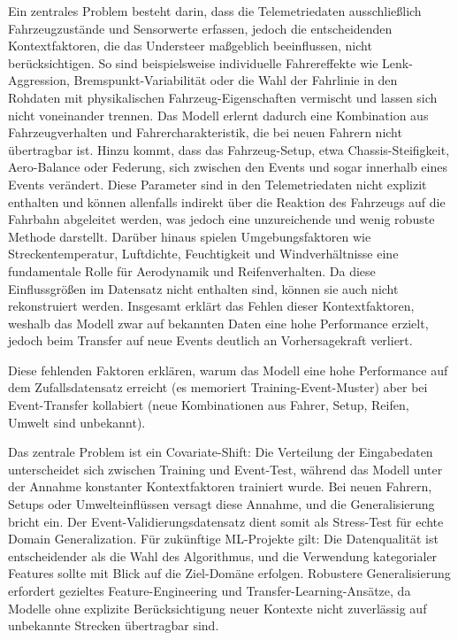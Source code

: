 Ein zentrales Problem besteht darin, dass die Telemetriedaten ausschließlich Fahrzeugzustände und Sensorwerte erfassen, jedoch die entscheidenden Kontextfaktoren, die das Understeer maßgeblich beeinflussen, nicht berücksichtigen. So sind beispielsweise individuelle Fahrereffekte wie Lenk-Aggression, Bremspunkt-Variabilität oder die Wahl der Fahrlinie in den Rohdaten mit physikalischen Fahrzeug-Eigenschaften vermischt und lassen sich nicht voneinander trennen. Das Modell erlernt dadurch eine Kombination aus Fahrzeugverhalten und Fahrercharakteristik, die bei neuen Fahrern nicht übertragbar ist. Hinzu kommt, dass das Fahrzeug-Setup, etwa Chassis-Steifigkeit, Aero-Balance oder Federung, sich zwischen den Events und sogar innerhalb eines Events verändert. Diese Parameter sind in den Telemetriedaten nicht explizit enthalten und können allenfalls indirekt über die Reaktion des Fahrzeugs auf die Fahrbahn abgeleitet werden, was jedoch eine unzureichende und wenig robuste Methode darstellt. Darüber hinaus spielen Umgebungsfaktoren wie Streckentemperatur, Luftdichte, Feuchtigkeit und Windverhältnisse eine fundamentale Rolle für Aerodynamik und Reifenverhalten. Da diese Einflussgrößen im Datensatz nicht enthalten sind, können sie auch nicht rekonstruiert werden. Insgesamt erklärt das Fehlen dieser Kontextfaktoren, weshalb das Modell zwar auf bekannten Daten eine hohe Performance erzielt, jedoch beim Transfer auf neue Events deutlich an Vorhersagekraft verliert.

Diese fehlenden Faktoren erklären, warum das Modell eine hohe Performance auf dem Zufallsdatensatz erreicht (es memoriert Training-Event-Muster) aber bei Event-Transfer kollabiert (neue Kombinationen aus Fahrer, Setup, Reifen, Umwelt sind unbekannt).

Das zentrale Problem ist ein Covariate-Shift: Die Verteilung der Eingabedaten unterscheidet sich zwischen Training und Event-Test, während das Modell unter der Annahme konstanter Kontextfaktoren trainiert wurde. Bei neuen Fahrern, Setups oder Umwelteinflüssen versagt diese Annahme, und die Generalisierung bricht ein. Der Event-Validierungsdatensatz dient somit als Stress-Test für echte Domain Generalization. Für zukünftige \ac{ML}-Projekte gilt: Die Datenqualität ist entscheidender als die Wahl des Algorithmus, und die Verwendung kategorialer Features sollte mit Blick auf die Ziel-Domäne erfolgen. Robustere Generalisierung erfordert gezieltes Feature-Engineering und Transfer-Learning-Ansätze, da Modelle ohne explizite Berücksichtigung neuer Kontexte nicht zuverlässig auf unbekannte Strecken übertragbar sind.
